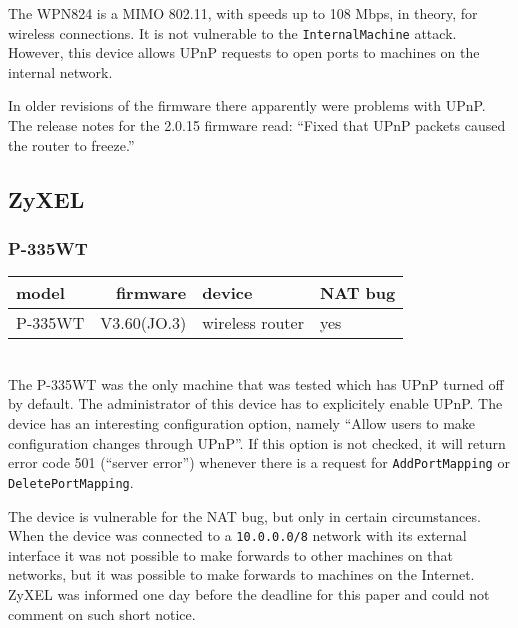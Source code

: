 \documentclass[10pt]{article}
\begin{document}
The WPN824 is a MIMO 802.11, with speeds up to 108 Mbps, in theory, for
wireless connections. It is not vulnerable to the \texttt{InternalMachine}
attack. However, this device allows UPnP requests to open ports to machines
on the internal network.

In older revisions of the firmware there apparently were problems with UPnP.
The release notes for the 2.0.15 firmware read: ``Fixed that UPnP packets
caused the router to freeze.''

\subsection{ZyXEL}
\subsubsection{P-335WT}

\begin{tabular}{|l|r|l|l|}
\hline
model & firmware & device & NAT bug \\
\hline
P-335WT & V3.60(JO.3) & wireless router & yes \\
\hline
\end{tabular} \\

The P-335WT was the only machine that was tested which has UPnP turned off
by default. The administrator of this device has to explicitely enable UPnP.
The device has an interesting configuration option, namely ``Allow users to
make configuration changes through UPnP''. If this option is not checked,
it will return error code 501 (``server error'') whenever there is a request
for \texttt{AddPortMapping} or \texttt{DeletePortMapping}.

The device is vulnerable for the NAT bug, but only in certain circumstances.
When the device was connected to a \texttt{10.0.0.0/8} network with its
external interface it was not possible to make forwards to other machines
on that networks, but it was possible to make forwards to machines on the
Internet. ZyXEL was informed one day before the deadline for this paper
and could not comment on such short notice.
\end{document}
